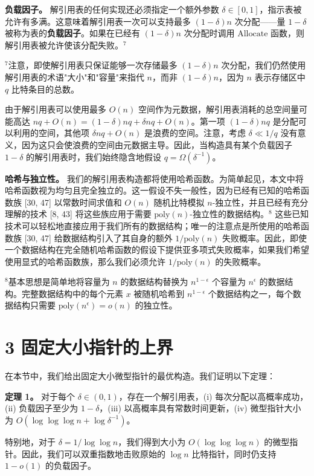 \documentclass[12pt,a4paper]{ctexart}
\theoremstyle{remark}
\begin{document}
\textbf{负载因子。} 解引用表的任何实现还必须指定一个额外参数 $\delta\in[0,1]$，指示表被允许有多满。这意味着解引用表一次可以支持最多 $(1-\delta)n$ 次分配——量 $1-\delta$ 被称为表的\textbf{负载因子}。如果在已经有 $(1-\delta)n$ 次分配时调用 $\text{Allocate}$ 函数，则解引用表被允许使该分配失败。$^7$

$^7$注意，即使解引用表只保证能够一次存储最多 $(1-\delta)n$ 次分配，我们仍然使用解引用表的术语"大小"和"容量"来指代 $n$，而非 $(1-\delta)n$，因为 $n$ 表示存储区中 $q$ 比特条目的总数。

由于解引用表可以使用最多 $O(n)$ 空间作为元数据，解引用表消耗的总空间量可能高达 $nq+O(n)=(1-\delta)nq+\delta nq+O(n)$。第一项 $(1-\delta)nq$ 是分配可以利用的空间，其他项 $\delta nq+O(n)$ 是浪费的空间。注意，考虑 $\delta\ll 1/q$ 没有意义，因为这只会使浪费的空间由元数据主导。因此，当构造具有某个负载因子 $1-\delta$ 的解引用表时，我们始终隐含地假设 $q=\Omega(\delta^{-1})$。

\textbf{哈希与独立性。} 我们的解引用表构造都将使用哈希函数。为简单起见，本文中将哈希函数视为均匀且完全独立的。这一假设不失一般性，因为已经有已知的哈希函数族 [30, 47] 以常数时间求值和 $O(n)$ 随机比特模拟 $n$-独立性，并且已经有充分理解的技术 [8, 43] 将这些族应用于需要 $\text{poly}(n)$-独立性的数据结构。$^8$ 这些已知技术可以轻松地直接应用于我们所有的数据结构；唯一的注意点是所使用的哈希函数族 [30, 47] 给数据结构引入了其自身的额外 $1/\text{poly}(n)$ 失败概率。因此，即使一个数据结构在完全随机哈希函数的假设下提供亚多项式失败概率，如果我们希望使用显式的哈希函数族，那么我们必须允许 $1/\text{poly}(n)$ 的失败概率。

$^8$基本思想是简单地将容量为 $n$ 的数据结构替换为 $n^{1-\epsilon}$ 个容量为 $n^\epsilon$ 的数据结构。完整数据结构中的每个元素 $x$ 被随机哈希到 $n^{1-\epsilon}$ 个数据结构之一，每个数据结构只需要 $\text{poly}(n^\epsilon)=o(n)$ 的独立性。

\medskip
\section{3 固定大小指针的上界}
在本节中，我们给出固定大小微型指针的最优构造。我们证明以下定理：

\textbf{定理 1。} 对于每个 $\delta\in(0,1)$，存在一个解引用表，(i) 每次分配以高概率成功，(ii) 负载因子至少为 $1-\delta$，(iii) 以高概率具有常数时间更新，(iv) 微型指针大小为 $O(\log\log\log n+\log\delta^{-1})$。

特别地，对于 $\delta=1/\log\log n$，我们得到大小为 $O(\log\log\log n)$ 的微型指针。因此，我们可以双重指数地击败原始的 $\log n$ 比特指针，同时仍支持 $1-o(1)$ 的负载因子。
\end{document}
